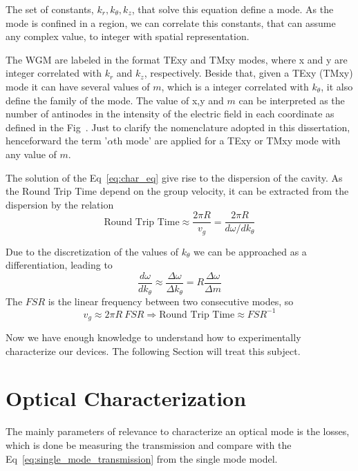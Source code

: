 The set of constants, $k_r,k_\theta,k_z$, that solve this equation define a mode. As the mode is confined in a region, we can correlate this constants, that can assume any complex value, to integer with spatial representation.

The WGM are labeled in the format TExy and TMxy modes, where x and y are integer correlated with $k_r$ and $k_z$, respectively. Beside that, given a TExy (TMxy) mode it can have several values of $m$, which is a integer correlated with $k_\theta$, it also define the family of the mode. The value of x,y and $m$ can be interpreted as the number of antinodes in the intensity of the electric field in each coordinate as defined in the Fig~. Just to clarify the nomenclature adopted in this dissertation, henceforward the term '$\alpha$th mode' are applied for a TExy or TMxy mode with any value of $m$. 

The solution of the Eq~\ref{eq:char_eq} give rise to the dispersion of the cavity. As the Round Trip Time depend on the group velocity, it can be extracted from the dispersion by the relation
\begin{equation}
    \text{Round Trip Time} \approx \frac{2\pi R}{v_g} = \frac{2\pi R}{d\omega/dk_\theta} 
\end{equation}

Due to the discretization of the values of $k_\theta$ we can be approached as a differentiation, leading to
\begin{equation}
    \frac{d\omega}{dk_\theta} \approx \frac{\Delta \omega}{\Delta k_\theta} = R\frac{\Delta \omega}{\Delta m}
\end{equation}
The $FSR$ is the linear frequency between two consecutive modes, so
\begin{equation}
    v_g \approx 2\pi R~FSR \Rightarrow \text{Round Trip Time} \approx FSR^{-1} 
\end{equation}

Now we have enough knowledge to understand how to experimentally characterize our devices. The following Section will treat this subject. 

\section{Optical Characterization}
\label{sec:optical_char}

The mainly parameters of relevance to characterize an optical mode is the losses, which is done be measuring the transmission and compare with the Eq~\ref{eq:single_mode_transmission} from the single mode model. 

